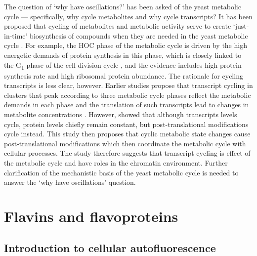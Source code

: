 The question of `why have oscillations?' has been asked of the yeast metabolic cycle --- specifically, why cycle metabolites and why cycle transcripts?
It has been proposed that cycling of metabolites and metabolic activity serve to create `just-in-time' biosynthesis of compounds when they are needed in the yeast metabolic cycle \parencite{zylstraMetabolicDynamicsCell2022}.
For example, the HOC phase of the metabolic cycle is driven by the high energetic demands of protein synthesis in this phase, which is closely linked to the G\textsubscript{1} phase of the cell division cycle \parencite{oneillEukaryoticCellBiology2020}, and the evidence includes high protein synthesis rate and high ribosomal protein abundance.
The rationale for cycling transcripts is less clear, however.
Earlier studies propose that transcript cycling in clusters that peak according to three metabolic cycle phases reflect the metabolic demands in each phase and the translation of such transcripts lead to changes in metabolite concentrations \parencite{tuLogicYeastMetabolic2005}.
However, \textcite{felthamTranscriptionalChangesAre2020} showed that although transcripts levels cycle, protein levels chiefly remain constant, but post-translational modifications cycle instead.
This study then proposes that cyclic metabolic state changes cause post-translational modifications which then coordinate the metabolic cycle with cellular processes.
The study therefore suggests that transcript cycling is effect of the metabolic cycle and have roles in the chromatin environment.
Further clarification of the mechanistic basis of the yeast metabolic cycle is needed to answer the `why have oscillations' question.

\section{Flavins and flavoproteins}
\label{sec:intro-flavin}

\subsection{Introduction to cellular autofluorescence}
\label{subsec:intro-flavin-autofluo}

